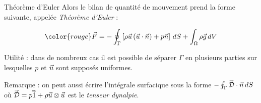 \begin{frame}{Théorème d'Euler}
Alors le bilan de quantité de mouvement prend la forme suivante, appelée {\em Théorème d'Euler} :

\begin{equation}
	\color{rouge}
	\myvec{F} 
	=   
  - \oint_{\Gamma} \left[ \rho \myvec{u} \left ( \myvec{u} \cdot \myvec{n} \right) + p \myvec{n} \right] \, dS
   + \int_\Omega \rho \myvec{g} \, dV
\end{equation}

\pause

Utilité : dans de nombreux cas il est possible de séparer $\Gamma$ en plusieurs parties sur lesquelles $p$ et $\vec{u}$ sont supposés uniformes.

Remarque :
on peut aussi écrire l'intégrale surfacique sous la forme
$- \oint_{\Gamma} \accentset{\Rightarrow}{\cal D} \cdot \vec{n}  \, dS$ où $\accentset{\Rightarrow}{\cal D}  = p \accentset{\Rightarrow}{1} + \rho \vec{u} \otimes \vec{u} $ est le {\em tenseur dynalpie}.




\vspace{0mm}

\end{frame}

